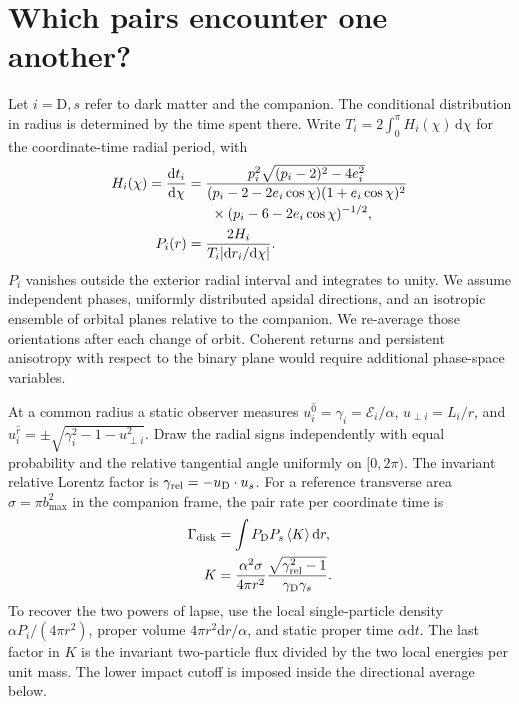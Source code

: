 \documentclass[aps,prd,reprint,amsmath,amssymb,nofootinbib]{revtex4-2}
\newcommand{\E}{\mathcal E}
\newcommand{\dd}{\mathrm{d}}
\newcommand{\DM}{\mathrm D}
\begin{document}
\section{Which pairs encounter one another?}
Let $i=\DM,s$ refer to dark matter and the companion. The conditional distribution in radius is determined by the time spent there. Write $T_i=2\int_0^\pi H_i(\chi)\,\dd\chi$ for the coordinate-time radial period, with
\begin{align}
 H_i(\chi)=\frac{\dd t_i}{\dd\chi}
 &=\frac{p_i^2\sqrt{(p_i-2)^2-4e_i^2}}
 {(p_i-2-2e_i\cos\chi)(1+e_i\cos\chi)^2}
 \nonumber\\[-1pt]
 &\hspace{1.7em}\times (p_i-6-2e_i\cos\chi)^{-1/2},\nonumber\\
 P_i(r)&=\frac{2H_i}{T_i|\dd r_i/\dd\chi|}.
 \label{dwell}
\end{align}
$P_i$ vanishes outside the exterior radial interval and integrates to unity. We assume independent phases, uniformly distributed apsidal directions, and an isotropic ensemble of orbital planes relative to the companion. We re-average those orientations after each change of orbit. Coherent returns and persistent anisotropy with respect to the binary plane would require additional phase-space variables.

At a common radius a static observer measures $u_i^{\hat0}=\gamma_i=\E_i/\alpha$, $u_{\perp i}=L_i/r$, and $u_i^{\hat r}=\pm\sqrt{\gamma_i^2-1-u_{\perp i}^2}$. Draw the radial signs independently with equal probability and the relative tangential angle uniformly on $[0,2\pi)$. The invariant relative Lorentz factor is $\gamma_{\rm rel}=-u_\DM\cdot u_s$. For a reference transverse area $\sigma=\pi b_{\max}^2$ in the companion frame, the pair rate per coordinate time is
\begin{align}
 \Gamma_{\rm disk}&=\int P_\DM P_s\,\langle K\rangle\,\dd r,\nonumber\\
 K&=\frac{\alpha^2\sigma}{4\pi r^2}
       \frac{\sqrt{\gamma_{\rm rel}^2-1}}{\gamma_\DM\gamma_s}.
 \label{rate}
\end{align}
To recover the two powers of lapse, use the local single-particle density $\alpha P_i/(4\pi r^2)$, proper volume $4\pi r^2\dd r/\alpha$, and static proper time $\alpha\dd t$. The last factor in $K$ is the invariant two-particle flux divided by the two local energies per unit mass. The lower impact cutoff is imposed inside the directional average below.
\end{document}
